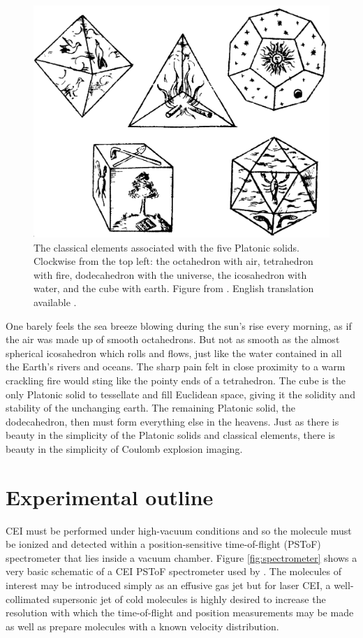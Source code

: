 \begin{figure}
  \centering
  \includegraphics[width=\textwidth]{gfx/PlatonicSolids}
  \caption[The classical elements associated with the five Platonic solids.]
  {The classical elements associated with the five Platonic solids. Clockwise from the top left: the octahedron with air, tetrahedron with fire, dodecahedron with the universe, the icosahedron with water, and the cube with earth. Figure from \citet[Book 2, p. 53]{Kepler1619}. English translation available \citep{Kepler97}.}
  \label{fig:platonicSolids}
\end{figure}

One barely feels the sea breeze blowing during the sun's rise every morning, as if the air was made up of smooth octahedrons. But not as smooth as the almost spherical icosahedron which rolls and flows, just like the water contained in all the Earth's rivers and oceans. The sharp pain felt in close proximity to a warm crackling fire would sting like the pointy ends of a tetrahedron. The cube is the only Platonic solid to tessellate and fill Euclidean space, giving it the solidity and stability of the unchanging earth. The remaining Platonic solid, the dodecahedron, then must form everything else in the heavens. Just as there is beauty in the simplicity of the Platonic solids and classical elements, there is beauty in the simplicity of Coulomb explosion imaging.

\section{Experimental outline} \label{sec:CEIphysics}
CEI must be performed under high-vacuum conditions and so the molecule must be ionized and detected within a position-sensitive time-of-flight (PSToF) spectrometer that lies inside a vacuum chamber. Figure \ref{fig:spectrometer} shows a very basic schematic of a CEI PSToF spectrometer used by \citet{Ramadhan16}. The molecules of interest may be introduced simply as an effusive gas jet but for laser CEI, a well-collimated supersonic jet of cold molecules is highly desired to increase the resolution with which the time-of-flight and position measurements may be made \citep{Dorner00} as well as prepare molecules with a known velocity distribution.

